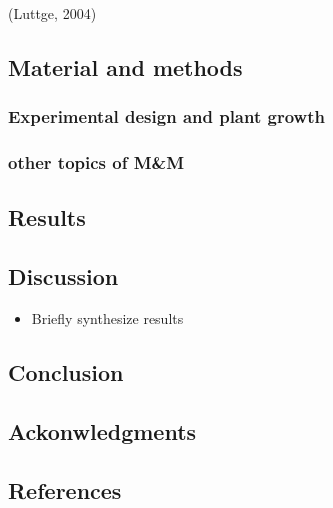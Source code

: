 \documentclass[
  12pt,
  letterpaper,
  DIV=11,
  numbers=noendperiod]{scrartcl}
\providecommand{\tightlist}{%
  \setlength{\itemsep}{0pt}\setlength{\parskip}{0pt}}\usepackage{longtable,booktabs,array}
\begin{document}
(Luttge, 2004)

\hypertarget{material-and-methods}{%
\subsection{Material and methods}\label{material-and-methods}}

\hypertarget{experimental-design-and-plant-growth}{%
\subsubsection{Experimental design and plant
growth}\label{experimental-design-and-plant-growth}}

\hypertarget{other-topics-of-mm}{%
\subsubsection{other topics of M\&M}\label{other-topics-of-mm}}

\hypertarget{results}{%
\subsection{Results}\label{results}}

\hypertarget{discussion}{%
\subsection{Discussion}\label{discussion}}

\begin{itemize}
\tightlist
\item
  Briefly synthesize results
\end{itemize}

\hypertarget{conclusion}{%
\subsection{Conclusion}\label{conclusion}}

\hypertarget{ackonwledgments}{%
\subsection{Ackonwledgments}\label{ackonwledgments}}

\clearpage

\hypertarget{references}{%
\subsection{References}\label{references}}
\end{document}

